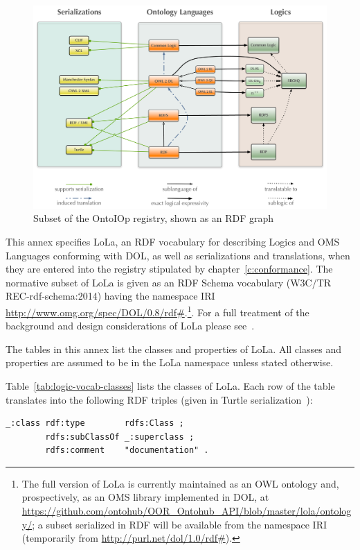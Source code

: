 \documentclass[10pt,fleqn,%
\ifpretendfinal
final%
\else
draft%
\fi,
]{scrreprt}
\newcommand*{\termref}[1]{\index{#1}#1\xspace}
\newcommand{\tablerefname}{Table}
\newcommand{\tref}[1]{\tablerefname~\ref{#1}}
\newcommand{\nisref}[1]{#1}
\begin{document}
\begin{figure}
  \centering
   \includegraphics[width=\textwidth]{illustrations/DOL-ontograph-layers-ISO} 
  \caption{Subset of the OntoIOp registry, shown as an RDF graph}
\label{f:DOL-threelayers}
\end{figure}

This annex specifies LoLa, an RDF vocabulary for describing Logics and OMS Languages conforming with DOL, as well as serializations and translations, when they are entered into the \termref{registry} stipulated by chapter~\ref{c:conformance}.
The normative subset of LoLa is given as an RDF Schema vocabulary (\nisref{W3C/TR REC-rdf-schema:2014}) having the namespace IRI \url{http://www.omg.org/spec/DOL/0.8/rdf\#}.\footnote{The full version of LoLa is currently maintained as an OWL ontology and, prospectively, as an OMS library implemented in DOL, at
\url{https://github.com/ontohub/OOR_Ontohub_API/blob/master/lola/ontology/}; a subset serialized in RDF will be available from the namespace IRI (temporarily from \url{http://purl.net/dol/1.0/rdf\#}).}.
For a full treatment of the background and design considerations of LoLa please see~\cite{LMK:LoLaModularOntologyLogLangTrans12}.

The tables in this annex list the classes and properties of LoLa.  All classes and properties are assumed to be in the LoLa namespace unless stated otherwise.

\tref{tab:logic-vocab-classes} lists the classes of LoLa.  Each row of the table translates into the following RDF triples (given in Turtle serialization~\cite{W3C:REC-turtle-20140225}):

\begin{lstlisting}[language=N3]
_:class rdf:type        rdfs:Class ;
        rdfs:subClassOf _:superclass ;
        rdfs:comment    "documentation" .
\end{lstlisting}
\end{document}
